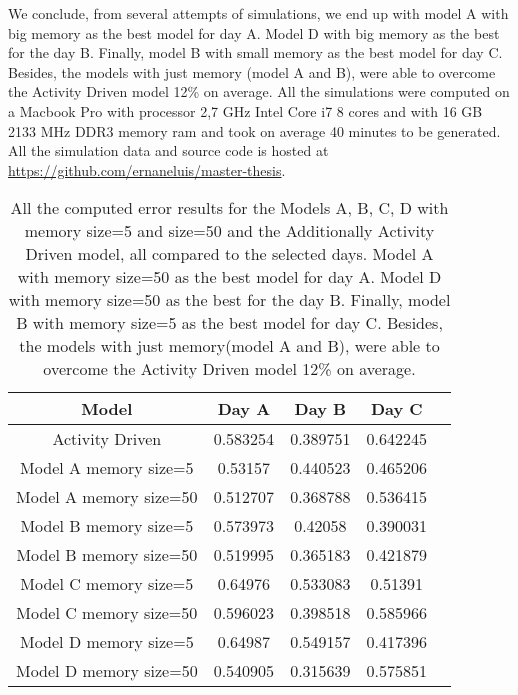 \documentclass[../../thesis.tex]{subfiles}
\begin{document}
We conclude, from several attempts of simulations, we end up with model A with big memory as the best model for day A. Model D with big memory as the best for the day B. Finally, model B with small memory as the best model for day C. Besides, the models with just memory (model A and B), were able to overcome the Activity Driven model 12\% on average. All the simulations were computed on a Macbook Pro with processor 2,7 GHz Intel Core i7 8 cores and with 16 GB 2133 MHz DDR3 memory ram and took on average 40 minutes to be generated. All the simulation data and source code is hosted at \href{https://github.com/ernaneluis/master-thesis}{https://github.com/ernaneluis/master-thesis}. 


\begin{table}
\begin{center}
 \begin{tabular}{ | c | c | c | c | c | } 
  \hline
  \textbf{Model} & \textbf{Day A} & \textbf{Day B} & \textbf{Day C} \\ 
  \hline
  Activity Driven & 0.583254 & 0.389751 & 0.642245\\ 
  \hline
  Model A memory size=5 & 0.53157 & 0.440523 & 0.465206\\ 
  \hline
  Model A memory size=50 & 0.512707 & 0.368788   & 0.536415\\ 
  \hline
  Model B memory size=5 & 0.573973 &   0.42058  & 0.390031\\ 
  \hline
    Model B memory size=50 & 0.519995 & 0.365183 &  0.421879\\
  \hline
   \hline
    Model C memory size=5 &0.64976 &  0.533083 & 0.51391\\
  \hline
   \hline
    Model C memory size=50 &0.596023   & 0.398518 & 0.585966\\
  \hline
  \hline
    Model D memory size=5 &0.64987 &   0.549157 & 0.417396\\
  \hline
    \hline
    Model D memory size=50 &0.540905   & 0.315639 & 0.575851\\
  \hline
 \end{tabular}
 
\caption{All the computed error results for the Models A, B, C, D with memory size=5 and size=50 and the Additionally Activity Driven model, all compared to the selected days. Model A with memory size=50 as the best model for day A. Model D with memory size=50 as the best for the day B. Finally, model B with memory size=5 as the best model for day C. Besides, the models with just memory(model A and B), were able to overcome the Activity Driven model 12\% on average.}
\label{tab:motifs_models_errors}
\end{center}
\end{table}
\end{document}
